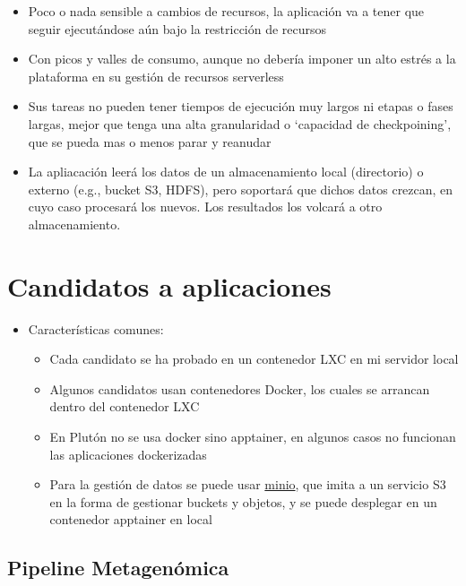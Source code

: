 \documentclass[preprint,3p]{elsarticle}
\begin{document}
\begin{itemize}

	\item Poco o nada sensible a cambios de recursos, la aplicación va a tener que seguir ejecutándose aún bajo la restricción de recursos

	\item Con picos y valles de consumo, aunque no debería imponer un alto estrés a la plataforma en su gestión de recursos serverless
		

	\item Sus tareas no pueden tener tiempos de ejecución muy largos ni etapas o fases largas, mejor que tenga una alta granularidad o `capacidad de checkpoining', que se pueda mas o menos parar y reanudar
	
	\item La apliacación leerá los datos de un almacenamiento local (directorio) o externo (e.g., bucket S3, HDFS), pero soportará que dichos datos crezcan, en cuyo caso procesará los nuevos. Los resultados los volcará a otro almacenamiento.
			
\end{itemize}


\section{Candidatos a aplicaciones}


\begin{itemize}
	\item Características comunes:
	\begin{itemize}
		\item Cada candidato se ha probado en un contenedor LXC en mi servidor local
		\item Algunos candidatos usan contenedores Docker, los cuales se arrancan dentro del contenedor LXC
		\item En Plutón no se usa docker sino apptainer, en algunos casos no funcionan las aplicaciones dockerizadas
		\item Para la gestión de datos se puede usar \href{https://min.io/}{minio}, que imita a un servicio S3 en la forma de gestionar buckets y objetos, y se puede desplegar en un contenedor apptainer en local
	\end{itemize}
\end{itemize}

\subsection{Pipeline Metagenómica}
\end{document}
